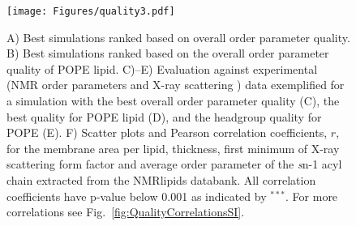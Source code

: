 \documentclass[fleqn,10pt]{wlscirep}
\begin{document}
\begin{figure}[!t]
    \centering
    \texttt{[image: Figures/quality3.pdf]}
    \caption{ A) Best simulations ranked based on overall order parameter quality.
    B) Best simulations ranked based on the overall order parameter quality of POPE lipid. 
    C)--E) Evaluation against experimental (NMR order parameters and X-ray scattering ) data exemplified for a simulation with the best overall order parameter quality (C), the best quality for POPE lipid (D), and the headgroup quality for POPE (E).
    F) Scatter plots and Pearson correlation coefficients, $r$, for the membrane area per lipid, thickness, first minimum of X-ray scattering form factor and average order parameter of the {\textit sn}-1 acyl chain extracted from the NMRlipids databank. All correlation coefficients have p-value below 0.001 as indicated by $^{***}$. For more correlations see Fig.~\ref{fig:QualityCorrelationsSI}.
    }
    \label{fig:quality}
\end{figure}



\end{document}
